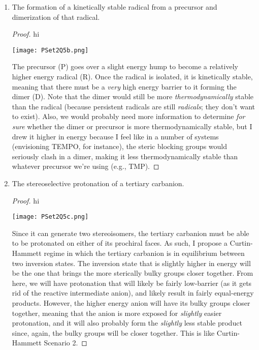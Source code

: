 \documentclass[../psets.tex]{subfiles}
\begin{document}
\begin{enumerate}
\begin{enumerate}
\begin{proof}
        \end{proof}
        \item The formation of a kinetically stable radical from a precursor and dimerization of that radical.
        \begin{proof}
            {\color{white}hi}
            \begin{center}
                \texttt{[image: PSet2Q5b.png]}
            \end{center}
            The precursor (P) goes over a slight energy hump to become a relatively higher energy radical (R). Once the radical is isolated, it is kinetically stable, meaning that there must be a \emph{very} high energy barrier to it forming the dimer (D). Note that the dimer would still be more \emph{thermodynamically} stable than the radical (because persistent radicals are still \emph{radicals}; they don't want to exist). Also, we would probably need more information to determine \emph{for sure} whether the dimer or precursor is more thermodynamically stable, but I drew it higher in energy because I feel like in a number of systems (envisioning TEMPO, for instance), the steric blocking groups would seriously clash in a dimer, making it less thermodynamically stable than whatever precursor we're using (e.g., TMP).
        \end{proof}
        \item The stereoselective protonation of a tertiary carbanion.
        \begin{proof}
            {\color{white}hi}
            \begin{center}
                \texttt{[image: PSet2Q5c.png]}
            \end{center}
            Since it can generate two stereoisomers, the tertiary carbanion must be able to be protonated on either of its prochiral faces. As such, I propose a Curtin-Hammett regime in which the tertiary carbanion is in equilibrium between two inversion states. The inversion state that is slightly higher in energy will be the one that brings the more sterically bulky groups closer together. From here, we will have protonation that will likely be fairly low-barrier (as it gets rid of the reactive intermediate anion), and likely result in fairly equal-energy products. However, the higher energy anion will have its bulky groups closer together, meaning that the anion is more exposed for \emph{slightly} easier protonation, and it will also probably form the \emph{slightly} less stable product since, again, the bulky groups will be closer together. This is like Curtin-Hammett Scenario 2.

\end{proof}
\end{enumerate}
\end{enumerate}
\end{document}
